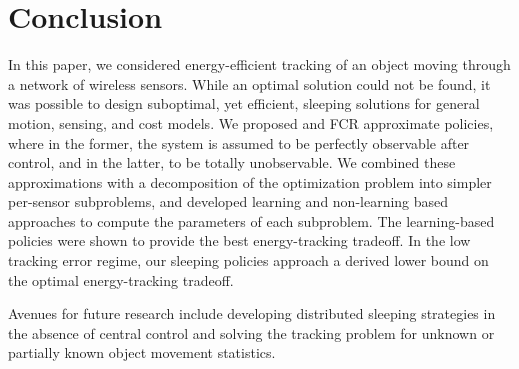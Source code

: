 \documentclass[journal,draftcls,onecolumn,11pt]{IEEEtran}
\newcommand{\QMDP}{}
\begin{document}
\section{Conclusion} \label{sec:concl}
In this paper, we considered energy-efficient tracking of an object moving through a network of wireless sensors. While an optimal solution could not be found, it was possible to design suboptimal, yet efficient, sleeping solutions for general motion, sensing, and cost models. We proposed \QMDP{} and FCR approximate policies, where in the former, the system is assumed to be perfectly observable after control, and in the latter, to be  totally unobservable. We combined these approximations with a decomposition of the optimization problem into simpler per-sensor subproblems, and developed learning and non-learning based approaches to compute the parameters of each subproblem. The learning-based \QMDP{} policies were shown to provide the best energy-tracking tradeoff. In the low tracking error regime, our sleeping policies approach a derived lower bound on the optimal energy-tracking tradeoff. 

Avenues for future research include developing distributed sleeping strategies in the absence of central control and solving the tracking problem for unknown or partially known object movement statistics.



\end{document}
